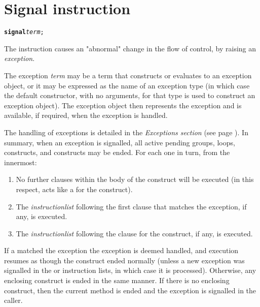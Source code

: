 \section{Signal instruction}\label{refsignal}
\index{,}
\index{,}
\begin{shaded}
\begin{alltt}
\textbf{signal} \emph{term};
\end{alltt}
\end{shaded}
 The  instruction causes an "abnormal" change
in the flow of control, by raising an \emph{exception}.
 
The exception \emph{term} may be a term that constructs or evaluates
to an exception object, or it may be expressed as the name of an
exception type (in which case the default constructor, with no
arguments, for that type is used to construct an exception object).
The exception object then represents the exception and is available, if
required, when the exception is handled.
 
The handling of exceptions is detailed in the
 \emph{Exceptions section} (see page \pageref{refexcep}).
In summary, when an exception is signalled, all active pending
 groups,  loops,  constructs, and
 constructs may be ended.
For each one in turn, from the innermost:
\begin{enumerate}
\item No further clauses within the body of the construct will be executed
(in this respect,  acts like a  for the
construct).
\item The \emph{instructionlist} following the first 
clause that matches the exception, if any, is executed.
\item The \emph{instructionlist} following the 
clause for the construct, if any, is executed.
\end{enumerate}
If a  matched the exception the exception is deemed
handled, and execution resumes as though the construct ended normally
(unless a new exception was signalled in the  or
 instruction lists, in which case it is processed).
Otherwise, any enclosing construct is ended in the same manner.
If there is no enclosing construct, then the current method is ended and
the exception is signalled in the caller.
 
